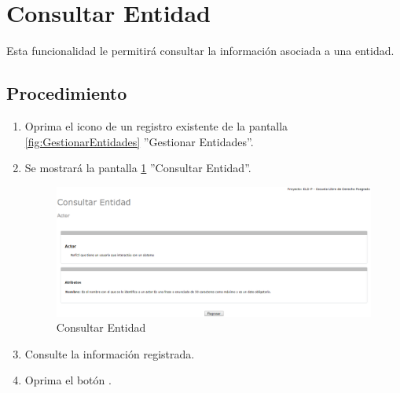 \hypertarget{cv:consultarEntidad}{\section{Consultar Entidad}} \label{sec:consultarEntidad}

	Esta funcionalidad le permitirá consultar la información asociada a una entidad.

		\subsection{Procedimiento}

			\begin{enumerate}
	
			\item Oprima el icono \IUConsultar{} de un registro existente de la pantalla \ref{fig:GestionarEntidades} ''Gestionar Entidades''.
	
			\item Se mostrará la pantalla \ref{fig:consultarEntidad} ''Consultar Entidad''.
			
			\begin{figure}[htbp!]
				\begin{center}
					\includegraphics[scale=0.5]{roles/lider/entidades/pantallas/IU12-4consultarEntidad}
					\caption{Consultar Entidad}
					\label{fig:consultarEntidad}
				\end{center}
			\end{figure}
						
			\item Consulte la información registrada.
			
			\item Oprima el botón \IURegresar.
		\end{enumerate}